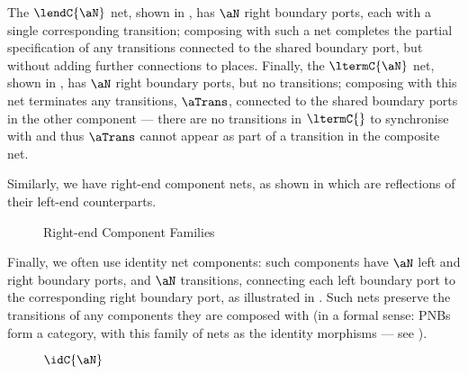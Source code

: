 The $\lendC{\aN}$ net, shown in , has $\aN$ right
boundary ports, each with a single corresponding transition; composing with
such a net completes the partial specification of any transitions connected to
the shared boundary port, but without adding further connections to places.
Finally, the $\ltermC{\aN}$ net, shown in , has
$\aN$ right boundary ports, but no transitions; composing with this net
terminates any transitions, $\aTrans$, connected to the shared boundary ports
in the other component --- there are no transitions in $\ltermC{}$ to
synchronise with and thus $\aTrans$ cannot appear as part of a transition in
the composite net.


Similarly, we have right-end component nets, as shown in
 which are reflections of their left-end
counterparts.

\begin{figure}[ht]
\centering
\begin{subfigure}{0.33\textwidth}
\centering
\usebox\epsilonBox
\caption{\epsilonC{\aN} }
\label{fig:epsilonComponent}
\end{subfigure}%
\begin{subfigure}{0.33\textwidth}
\centering
\usebox\rendBox
\caption{\rendC{\aN} }
\label{fig:rendComponent}
\end{subfigure}%
\begin{subfigure}{0.33\textwidth}
\centering
\usebox\rtermBox
\caption{\rtermC{\aN} }
\label{fig:rtermComponent}
\end{subfigure}%
\caption{Right-end Component Families}
\label{fig:rightendComponents}
\end{figure}

Finally, we often use identity net components: such components have $\aN$ left
and right boundary ports, and $\aN$ transitions, connecting each left boundary
port to the corresponding right boundary port, as illustrated in
. Such nets preserve the transitions of any components
they are composed with (in a formal sense: PNBs form a category, with this
family of nets as the identity morphisms --- see ).

\begin{figure}[ht]
\centering
{}
\caption{$\idC{\aN}$ \withNetType{\aN}{\aN}}
\label{fig:idComponent}
\end{figure}

